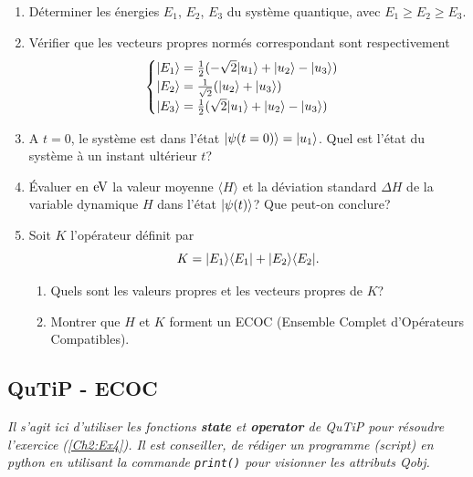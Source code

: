 {\begin{enumerate}
\item Déterminer les énergies $E_1$, $E_{2}$, $E_3$ du système quantique,
avec $E_1\geq E_{2}\geq E_3$.

\item Vérifier que les vecteurs propres normés correspondant sont
respectivement%
\begin{equation}
\begin{cases}
\vert E_1\rangle=\frac{1}{2}(-\sqrt{2}\vert u_1\rangle +\vert u_{2}\rangle-\vert u_3\rangle) \\
\vert E_{2}\rangle=\frac{1}{\sqrt{2}}(\vert u_{2}\rangle+\vert u_3\rangle) \\
\vert E_3\rangle=\frac{1}{2}(\sqrt{2}\vert u_1\rangle +\vert u_{2}\rangle-\vert u_3\rangle)
\end{cases}
\end{equation}

\item A $t=0$, le système est dans l'état $\vert\psi(t=0)\rangle=\vert u_1\rangle$. Quel
est l'état du système à un instant ultérieur $t$?

\item Évaluer en $\operatorname{eV}$ la valeur moyenne $\langle H\rangle$ et la
déviation standard $\Delta H$ de la variable dynamique $H$ dans l'état
$\vert\psi(t)\rangle$? Que peut-on conclure?

\item Soit $K$ l'opérateur définit par%
\begin{equation}
K=\vert E_1\rangle\langle E_1\vert +\vert E_{2}\rangle\langle E_{2}\vert.
\end{equation}

\begin{enumerate}
\item Quels sont les valeurs propres et les vecteurs propres de $K$?

\item Montrer que $H$ et $K$ forment un ECOC (Ensemble Complet d'Opérateurs
Compatibles).
\end{enumerate}
\end{enumerate}

\subsection{QuTiP - ECOC}

\emph{Il s'agit ici d'utiliser les fonctions \textbf{state} et \textbf{operator} 
de QuTiP pour résoudre l'exercice (\ref{Ch2:Ex4}). Il est  conseiller, de 
rédiger un programme (script) en python en utilisant la commande 
\texttt{print()} pour visionner les attributs Qobj.}

}
